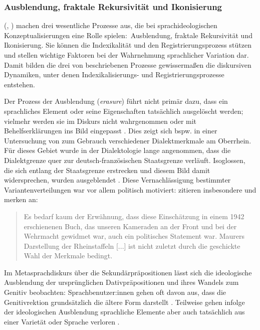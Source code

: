 \subsubsection{Ausblendung, fraktale Rekursivität und Ikonisierung}
\label{sec:Prozesse}
\citeauthor{Irvine2000} (\citeyear{Irvine2000}, \citealp[s. auch][]{Gal.1995} \citeyear[und][]{Gal.2019}) machen drei wesentliche Prozesse aus, die bei sprachideologischen Konzeptualisierungen eine Rolle spielen:~Ausblendung, fraktale Rekursivit{\"a}t und Ikonisierung. 
Sie können die Indexikalität und den Registrierungsprozess stützen und stellen wichtige Faktoren bei der Wahrnehmung sprachlicher Variation dar.
Damit bilden die drei von \citet{Irvine2000} beschriebenen Prozesse gewissermaßen die diskursiven Dynamiken, unter denen Indexikalisierungs- und Registrierungsprozesse entstehen. 

\begin{sloppypar}
Der Prozess der Ausblendung (\textit{erasure}) f{\"u}hrt nicht prim{\"a}r dazu, dass ein sprachliches Element oder seine Eigenschaften tats{\"a}chlich ausgel{\"o}scht werden; vielmehr werden sie im Diskurs nicht wahrgenommen oder mit Behelfserkl{\"a}rungen ins Bild eingepasst \citep[s.][38]{Irvine2000}.   
Dies zeigt sich bspw. in einer Untersuchung von \citet{Auer.2017} zum Gebrauch verschiedener Dialektmerkmale am Oberrhein. 
Für dieses Gebiet wurde in der Dialektologie lange angenommen, dass die Dialektgrenze quer zur deutsch-französischen Staatsgrenze verläuft.
Isoglossen, die sich entlang der Staatsgrenze erstrecken und diesem Bild damit widersprechen, wurden ausgeblendet \citep[s.][29]{Auer.2017}. 
Diese Vernachlässigung bestimmter {Va\-rian\-ten\-ver\-tei\-lungen} war vor allem politisch motiviert: \citet{Auer.2017} zitieren insbesondere \citet{Maurer.1942} und merken an: 
\begin{quote} Es bedarf kaum der Erwähnung, dass diese Einschätzung in einem 1942 erschienenen Buch, das \glqq unseren Kameraden an der Front und bei der Wehrmacht\grqq{} gewidmet war, auch ein politisches Statement war. Maurers Darstellung der \glqq Rheinstaffeln\grqq{} [...] ist nicht zuletzt durch die geschickte Wahl der Merkmale bedingt.~\citep[29]{Auer.2017}\end{quote}
Im Metasprachdiskurs {\"u}ber die Sekund{\"a}rpr{\"a}positionen l{\"a}sst sich die ideologische Ausblendung der urspr{\"u}nglichen Dativpr{\"a}positionen und ihres Wandels zum Genitiv beobachten: Sprachbenutzer:innen gehen oft davon aus, dass die Genitivrektion grundsätzlich die ältere Form darstellt \citep[s.][46]{Szczepaniak2014}. 
Teilweise gehen infolge der ideologischen Ausblendung sprachliche Elemente aber auch tatsächlich aus einer Variet{\"a}t oder Sprache verloren \citep[s.][38--39]{Irvine2000}.
\end{sloppypar}


